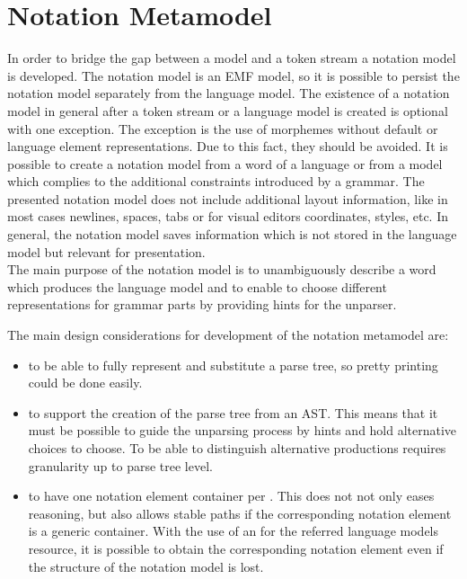 \section{Notation Metamodel} \label{chp:NotMM}
In order to bridge the gap between a model and a token stream a notation model is developed. The notation model is an EMF model, so it is possible to persist the notation model separately from the language model. The existence of a notation model in general after a token stream or a language model is created is optional with one exception. The exception is the use of morphemes without default or language element representations. Due to this fact, they should be avoided. It is possible to create a notation model from a word of a language or from a model which complies to the additional constraints introduced by a grammar. The presented notation model does not include additional layout information, like in most cases newlines, spaces, tabs or for visual editors coordinates, styles, etc. In general, the notation model saves information which is not stored in the language model but relevant for presentation.\\

The main purpose of the notation model is to unambiguously describe a word which produces the language model and to enable to choose different representations for grammar parts by providing hints for the unparser.

The main design considerations for development of the notation metamodel are:
\begin{itemize}
	\item to be able to fully represent and substitute a parse tree, so pretty printing could be done easily.
	\item to support the creation of the parse tree from an AST. This means that it must be possible to guide the unparsing process by hints and hold alternative choices to choose. To be able to distinguish alternative productions requires granularity up to parse tree level.
	\item to have one notation element container per . This does not not only eases reasoning, but also allows stable paths if the corresponding notation element is a generic container. With the use of an  for the referred language models resource, it is possible to obtain the corresponding notation element even if the structure of the notation model is lost. 
\end{itemize}

